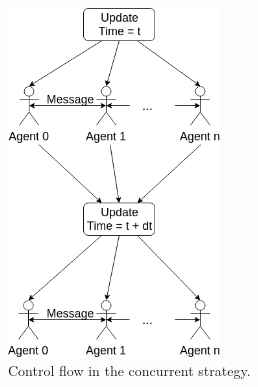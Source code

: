 \begin{figure}[H]
	\centering
	\includegraphics[width=0.5\textwidth, angle=0]{./fig/implabs/concurrent.png}
	\caption{Control flow in the concurrent strategy.}
	\label{fig:strategy_conc}
\end{figure}

